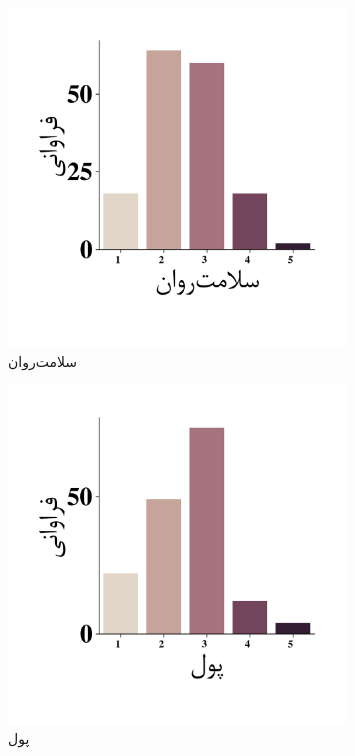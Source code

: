 \begin{figure}[htpb]
    \centering
    \includegraphics[width=0.8\textwidth]{./img/ordinal/MentalHealthQuestion.png}
    \caption{سلامت‌روان}
    \label{fig:MentalHealthQuestion}
\end{figure}
\begin{figure}[htpb]
    \centering
    \includegraphics[width=0.8\textwidth]{./img/ordinal/MoneyQuestion.png}
    \caption{پول}
    \label{fig:MoneyQuestion}
\end{figure}
